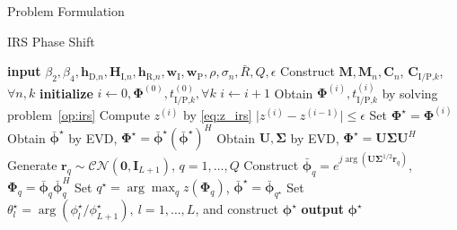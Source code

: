 \documentclass[journal]{IEEEtran}
\begin{document}
\begin{section}{Problem Formulation}
\begin{subsection}{IRS Phase Shift}
			\begin{algorithm}[!t]
				\caption{SCA: IRS Phase Shift.}
				\label{al:irs}
				\begin{algorithmic}[1]
					\State \textbf{input} $\beta_2,\beta_4,\boldsymbol{h}_{\text{D,}n},\boldsymbol{H}_{\text{I,}n},\boldsymbol{h}_{\text{R,}n},\boldsymbol{w}_{\text{I}},\boldsymbol{w}_\text{P},\rho,\sigma_n,\bar{R},Q,\epsilon$
					\State Construct $\boldsymbol{M},\boldsymbol{M}_n,\boldsymbol{C}_{n}$, $\boldsymbol{C}_{\text{I/P,}k}$, $\forall n,k$
					\State \textbf{initialize} $i \gets 0,\boldsymbol{\Phi}^{(0)},t_{\text{I/P,}k}^{(0)}, \forall k$
					\Repeat
						\State $i \gets i + 1$
						\State Obtain $\boldsymbol{\Phi}^{(i)}, t_{\text{I/P,}k}^{(i)}$ by solving problem~\eqref{op:irs}
						\State Compute $z^{(i)}$ by \eqref{eq:z_irs}
					\Until $\lvert z^{(i)}-z^{(i-1)} \rvert \le \epsilon$
					\State Set $\boldsymbol{\Phi}^{\star}=\boldsymbol{\Phi}^{(i)}$
						\State Obtain $\bar{\boldsymbol{\phi}}^\star$ by EVD, $\boldsymbol{\Phi}^{\star}=\bar{\boldsymbol{\phi}}^\star(\bar{\boldsymbol{\phi}}^\star)^H$
					\Else
						\State Obtain $\boldsymbol{U},\boldsymbol{\Sigma}$ by EVD, $\boldsymbol{\Phi}^{\star}=\boldsymbol{U}\boldsymbol{\Sigma}\boldsymbol{U}^H$
						\State Generate $\boldsymbol{r}_q \sim \mathcal{CN}(\boldsymbol{0},\boldsymbol{I}_{L+1})$, $q=1,\dots,Q$
						\State Construct $\bar{\boldsymbol{\phi}}_q=e^{j\arg\left(\boldsymbol{U}\boldsymbol{\Sigma}^{1/2}\boldsymbol{r}_q\right)}$, $\boldsymbol{\Phi}_q=\bar{\boldsymbol{\phi}}_q\bar{\boldsymbol{\phi}}_q^H$
						\State Set $q^{\star}=\arg\max_q{z(\boldsymbol{\Phi}_q)}$, $\bar{\boldsymbol{\phi}}^\star=\bar{\boldsymbol{\phi}}_{q^{\star}}$
					\EndIf
					\State Set $\theta_l^\star=\arg(\phi_l^\star/\phi_{L+1}^\star), \ l=1,\dots,L$, and construct $\boldsymbol{\phi}^{\star}$
					\State \textbf{output} $\boldsymbol{\phi}^{\star}$
				\end{algorithmic}
			\end{algorithm}
		\end{subsection}



\end{section}
\end{document}
